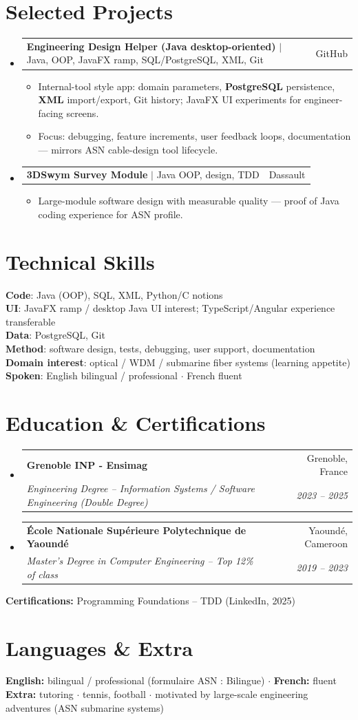 \documentclass[letterpaper,10.5pt]{article}
\makeatletter
\newcommand{\resumeItem}[1]{\item\small{#1 \vspace{-1.5pt}}}
\newcommand{\resumeSubheading}[4]{\vspace{-1pt}\item\begin{tabular*}{0.97\textwidth}[t]{l@{\extracolsep{\fill}}r}\textbf{#1} & #2 \\\textit{\small#3} & \textit{\small #4} \\\end{tabular*}\vspace{-5pt}}
\newcommand{\resumeProjectHeading}[2]{\item\begin{tabular*}{0.97\textwidth}{l@{\extracolsep{\fill}}r}\small#1 & #2 \\\end{tabular*}\vspace{-5pt}}
\newcommand{\resumeSubHeadingListStart}{\begin{itemize}[leftmargin=0.15in, label={}]}
\newcommand{\resumeSubHeadingListEnd}{\end{itemize}}
\newcommand{\resumeItemListStart}{\begin{itemize}[leftmargin=0.18in]}
\newcommand{\resumeItemListEnd}{\end{itemize}\vspace{-3pt}}
\makeatother
\begin{document}
\section{Selected Projects}
\resumeSubHeadingListStart
  \resumeProjectHeading{\textbf{Engineering Design Helper (Java desktop-oriented)} $|$ Java, OOP, JavaFX ramp, SQL/PostgreSQL, XML, Git}{GitHub}
    \resumeItemListStart
      \resumeItem{Internal-tool style app: domain parameters, \textbf{PostgreSQL} persistence, \textbf{XML} import/export, Git history; JavaFX UI experiments for engineer-facing screens.}
      \resumeItem{Focus: debugging, feature increments, user feedback loops, documentation --- mirrors ASN cable-design tool lifecycle.}
    \resumeItemListEnd
  \resumeProjectHeading{\textbf{3DSwym Survey Module} $|$ Java OOP, design, TDD}{Dassault}
    \resumeItemListStart
      \resumeItem{Large-module software design with measurable quality --- proof of Java coding experience for ASN profile.}
    \resumeItemListEnd
\resumeSubHeadingListEnd
\section{Technical Skills}
\begin{itemize}[leftmargin=0.15in, label={}]\small{\item{\textbf{Code}: Java (OOP), SQL, XML, Python/C notions \\ \textbf{UI}: JavaFX ramp / desktop Java UI interest; TypeScript/Angular experience transferable \\ \textbf{Data}: PostgreSQL, Git \\ \textbf{Method}: software design, tests, debugging, user support, documentation \\ \textbf{Domain interest}: optical / WDM / submarine fiber systems (learning appetite) \\ \textbf{Spoken}: English bilingual / professional $\cdot$ French fluent}}\end{itemize}
\section{Education \& Certifications}
\resumeSubHeadingListStart
  \resumeSubheading{Grenoble INP - Ensimag}{Grenoble, France}{Engineering Degree -- Information Systems / Software Engineering (Double Degree)}{2023 -- 2025}
  \resumeSubheading{\'Ecole Nationale Sup\'erieure Polytechnique de Yaound\'e}{Yaound\'e, Cameroon}{Master's Degree in Computer Engineering -- Top 12\% of class}{2019 -- 2023}
\resumeSubHeadingListEnd
\small{\textbf{Certifications:} Programming Foundations -- TDD (LinkedIn, 2025)}
\section{Languages \& Extra}
\small{\textbf{English:} bilingual / professional (formulaire ASN : Bilingue) $\cdot$ \textbf{French:} fluent \\ \textbf{Extra:} tutoring $\cdot$ tennis, football $\cdot$ motivated by large-scale engineering adventures (ASN submarine systems)}
\end{document}
